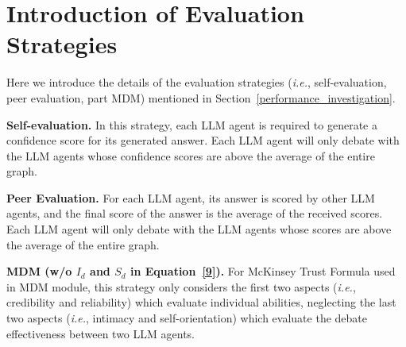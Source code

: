 \section{Introduction of Evaluation Strategies}
\label{appendix_evaluation_strategies}

Here we introduce the details of the evaluation strategies (\textit{i.e.}, self-evaluation, peer evaluation, part MDM) mentioned in Section~\ref{performance_investigation}.

\textbf{Self-evaluation.} In this strategy, each LLM agent is required to generate a confidence score for its generated answer. Each LLM agent will only debate with the LLM agents whose confidence scores are above the average of the entire graph.

\textbf{Peer Evaluation. } For each LLM agent, its answer is scored by other LLM agents, and the final score of the answer is the average of the received scores. Each LLM agent will only debate with the LLM agents whose scores are above the average of the entire graph.

\textbf{MDM (w/o $I_{d}$ and $S_{d}$ in Equation~\eqref{9}).} For McKinsey Trust Formula used in MDM module, this strategy only considers the first two aspects (\textit{i.e.}, credibility and reliability) which evaluate individual abilities, neglecting the last two aspects (\textit{i.e.}, intimacy and self-orientation) which evaluate the debate effectiveness between two LLM agents.